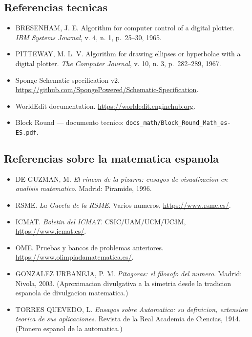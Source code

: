 \documentclass[12pt,a4paper]{scrartcl}
\begin{document}
\subsection{Referencias tecnicas}
\begin{itemize}[leftmargin=1.3em,itemsep=0.15em,topsep=0.3em]
  \item BRESENHAM, J. E. Algorithm for computer control of a digital plotter. \emph{IBM Systems Journal}, v. 4, n. 1, p.~25--30, 1965.
  \item PITTEWAY, M. L. V. Algorithm for drawing ellipses or hyperbolae with a digital plotter. \emph{The Computer Journal}, v. 10, n. 3, p.~282--289, 1967.
  \item Sponge Schematic specification v2. \url{https://github.com/SpongePowered/Schematic-Specification}.
  \item WorldEdit documentation. \url{https://worldedit.enginehub.org}.
  \item Block Round --- documento tecnico: \texttt{docs\_math/Block\_Round\_Math\_es-ES.pdf}.
\end{itemize}

\subsection{Referencias sobre la matematica espanola}
\begin{itemize}[leftmargin=1.3em,itemsep=0.15em,topsep=0.3em]
  \item DE GUZMAN, M. \emph{El rincon de la pizarra: ensayos de visualizacion en analisis matematico}. Madrid: Piramide, 1996.
  \item RSME. \emph{La Gaceta de la RSME}. Varios numeros, \url{https://www.rsme.es/}.
  \item ICMAT. \emph{Boletin del ICMAT}. CSIC/UAM/UCM/UC3M, \url{https://www.icmat.es/}.
  \item OME. Pruebas y bancos de problemas anteriores. \url{https://www.olimpiadamatematica.es/}.
  \item GONZALEZ URBANEJA, P. M. \emph{Pitagoras: el filosofo del numero}. Madrid: Nivola, 2003. (Aproximacion divulgativa a la simetria desde la tradicion espanola de divulgacion matematica.)
  \item TORRES QUEVEDO, L. \emph{Ensayos sobre Automatica: su definicion, extension teorica de sus aplicaciones}. Revista de la Real Academia de Ciencias, 1914. (Pionero espanol de la automatica.)
\end{itemize}

\newpage
\appendix
\renewcommand{\thesection}{\Alph{section}}
\setcounter{section}{0}
\end{document}
